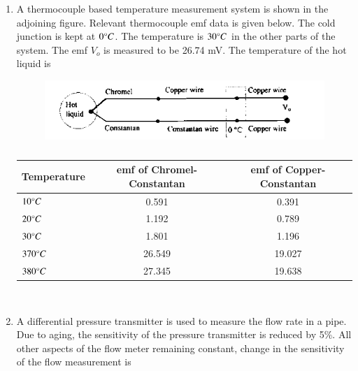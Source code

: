 \documentclass[journal,12pt,onecolumn]{IEEEtran}
\theoremstyle{remark}
\begin{document}
\begin{enumerate}
\item A thermocouple based temperature measurement system is shown in the adjoining figure. Relevant thermocouple emf data  is given below. The cold junction is kept at $0\degree C$. The temperature is $30\degree C$ in the other parts of the system. The emf $V_o$ is measured to be 26.74 mV. The temperature of the hot liquid is
\begin{figure}[H]
    \centering
    \includegraphics[width = 0.7\columnwidth]{q35}
    \caption*{}
    \label{fig:Q35}
\end{figure}
\begin{table}[H]
    \centering\normalsize
    \begin{tabular}{|l|c|c|}
        \hline
        \textbf{Temperature} & \textbf{emf of Chromel-Constantan} & \textbf{emf of Copper-Constantan} \\
        \hline
        $10\degree C$ & 0.591 & 0.391 \\
        \hline
        $20\degree C$ & 1.192 & 0.789 \\
        \hline
        $30\degree C$ & 1.801 & 1.196 \\
        \hline
        $370\degree C$ & 26.549 & 19.027 \\
        \hline
        $380\degree C$ & 27.345 & 19.638 \\
        \hline
    \end{tabular}
    \caption*{}
    \label{tab:Q35}
\end{table}

\hfill{}\
\begin{enumerate}  \end{enumerate}



\item A differential pressure transmitter is used to measure the flow rate in a pipe. Due to aging, the sensitivity of the pressure transmitter is reduced by 5\%. All other aspects of the flow meter remaining constant, change in the sensitivity of the flow measurement is


\end{enumerate}
\end{document}
